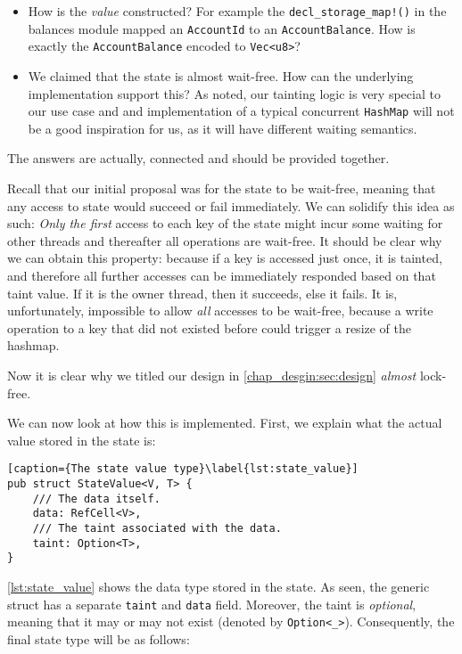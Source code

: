 \begin{itemize}
	\item How is the \textit{value} constructed? For example the \texttt{decl\_storage\_map!()} in
	the balances module mapped an \texttt{AccountId} to an \texttt{AccountBalance}. How is exactly
	the \texttt{AccountBalance} encoded to \texttt{Vec<u8>}?
	\item We claimed that the state is almost wait-free. How can the underlying implementation
	support this? As noted, our tainting logic is very special to our use case and and
	implementation of a typical concurrent \texttt{HashMap} will not be a good inspiration for us,
	as it will have different waiting semantics.
\end{itemize}

The answers are actually, connected and should be provided together.

Recall that our initial proposal was for the state to be wait-free, meaning that any access to state
would succeed or fail immediately. We can solidify this idea as such: \textit{Only the first} access
to each key of the state might incur some waiting for other threads and thereafter all operations
are wait-free. It should be clear why we can obtain this property: because if a key is accessed just
once, it is tainted, and therefore all further accesses can be immediately responded based on that
taint value. If it is the owner thread, then it succeeds, else it fails. It is, unfortunately,
impossible to allow \textit{all} accesses to be wait-free, because a write operation to a key that
did not existed before could trigger a resize of the hashmap.

\begin{remark}
	Now it is clear why we titled our design in \ref{chap_desgin:sec:design} \textit{almost}
	lock-free.
\end{remark}

We can now look at how this is implemented. First, we explain what the actual value stored in the
state is:

\begin{lstlisting}[caption={The state value type}\label{lst:state_value}]
pub struct StateValue<V, T> {
	/// The data itself.
	data: RefCell<V>,
	/// The taint associated with the data.
	taint: Option<T>,
}
\end{lstlisting}

\ref{lst:state_value} shows the data type stored in the state. As seen, the generic struct has a
separate \texttt{taint} and \texttt{data} field. Moreover, the taint is \textit{optional}, meaning
that it may or may not exist (denoted by \texttt{Option<\_>}). Consequently, the final state type
will be as follows:

